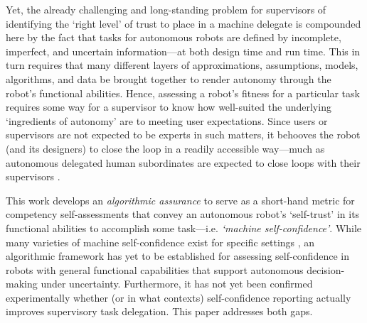 Yet, the already challenging and long-standing problem for supervisors of identifying the `right level' of trust to place in a machine delegate \cite{Muir1994-ow} is compounded here by the fact that tasks for autonomous robots are defined by incomplete, imperfect, and uncertain information---at both design time and run time. This in turn requires that many different layers of approximations, assumptions, models, algorithms, and data be brought together to render autonomy through the robot's functional abilities. Hence, assessing a robot's fitness for a particular task requires some way for a supervisor to know how well-suited the underlying `ingredients of autonomy' are to meeting user expectations. Since users or supervisors are not expected to be experts in such matters, it behooves the robot (and its designers) to close the loop in a readily accessible way---much as autonomous delegated human subordinates are expected to close loops with their supervisors \cite{Miller2014-av}. 

This work develops an \emph{algorithmic assurance} \cite{Israelsen2019-to} to serve as a short-hand metric for competency self-assessments that convey an autonomous robot's `self-trust' in its functional abilities to accomplish some task---i.e. \emph{`machine self-confidence'}. While many varieties of machine self-confidence exist for specific settings \cite{Hutchins2015-if, Kuter2015-qh,Sweet2016-tz,  Zagorecki2015-qy}, an algorithmic framework has yet to be established for assessing self-confidence in robots with general functional capabilities that support autonomous decision-making under uncertainty. Furthermore, it has not yet been confirmed experimentally whether (or in what contexts) self-confidence reporting actually improves supervisory task delegation. %
This paper addresses both gaps. %

